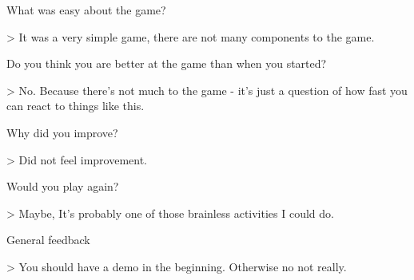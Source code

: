 What was easy about the game?

    > It was a very simple game, there are not many
      components to the game.

Do you think you are better at the game than when you started?

    > No. Because there's not much to the game - it's just
      a question of how fast you can react to things like
      this.

Why did you improve?

    > Did not feel improvement.

Would you play again?

    > Maybe, It's probably one of those brainless activities 
      I could do.

General feedback

    > You should have a demo in the beginning. Otherwise
      no not really.
